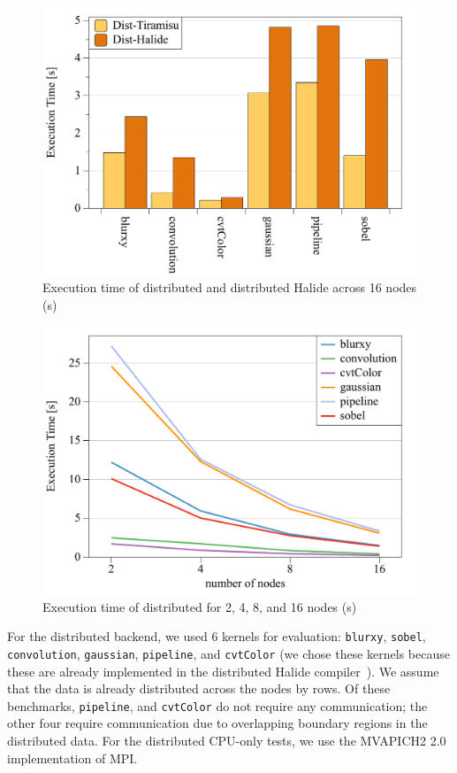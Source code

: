 \begin{figure}
\centering
 \includegraphics[width=0.8\columnwidth]{./figures/tiramisudist_vs_halidedist}
 \caption{Execution time of distributed \framework{} and distributed Halide across 16 nodes (s)}
 \label{fig:distCPU_tiramisu_halide_exec}
 \vspace{-0.5cm}
\end{figure}

\begin{figure}
\centering
 \includegraphics[width=0.8\columnwidth]{./figures/tiramisudist}
 \caption{Execution time of distributed \framework{} for 2, 4, 8, and 16 nodes (s)}
 \label{fig:distCPU_tiramisu_scaling_exec}
 \vspace{-0.25cm}
\end{figure}

For the \framework{} distributed backend, we used  6 kernels for evaluation: \texttt{blurxy}, \texttt{sobel}, \texttt{convolution}, \texttt{gaussian}, \texttt{pipeline}, and \texttt{cvtColor} (we chose these kernels because these are already implemented in the distributed Halide compiler~\cite{denniston2016distributed}).  We assume that the data is already distributed across the nodes by rows. Of these benchmarks, \texttt{pipeline}, and \texttt{cvtColor} do not require any communication; the other four require communication due to overlapping boundary regions in the distributed data. For the distributed CPU-only tests, we use the MVAPICH2 2.0 \cite{mvapich2} implementation of MPI. 

